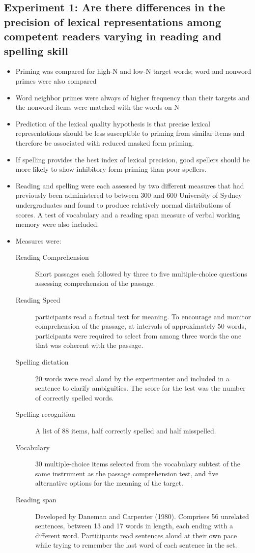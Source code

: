 \documentclass[]{article}
\begin{document}
		\subsection{Experiment 1: Are there differences in the precision of lexical representations among competent readers varying in reading and spelling skill}	
		\begin{itemize}
		\item Priming was compared for high-N and low-N target words; word and nonword primes were also compared
		\item Word neighbor primes were always of higher frequency than their targets and the nonword items were matched with the words on N
		\item Prediction of the lexical quality hypothesis is that precise lexical representations should be less susceptible to priming from similar items and therefore be associated with reduced masked form priming.
		\item If spelling provides the best index of lexical precision, good spellers should be more likely to show inhibitory form priming than poor spellers.
		\item  Reading and spelling were each assessed by two different measures that had previously been administered to between 300 and 600 University of Sydney undergraduates and found to produce relatively normal distributions of scores. A test of vocabulary and a reading span measure of verbal working memory were also included.
		\item Measures were:
		\begin{description}
			\item [Reading Comprehension]  Short passages each  followed by three to five multiple-choice questions assessing comprehension of the passage.
			\item [Reading Speed] participants read a factual text for meaning. To encourage and monitor comprehension of the passage, at intervals of approximately 50 words, participants were required to select from among three words the one that was coherent with the passage.
			\item[Spelling dictation] 20 words were read aloud by the experimenter and included in a sentence to clarify ambiguities. The score for the test was the number of correctly spelled words.
			\item[Spelling recognition] A list of 88 items, half correctly spelled and half misspelled.
			\item[Vocabulary]  30 multiple-choice items selected from the vocabulary subtest of the same instrument as the passage comprehension test, and five alternative options for the meaning of the target.
			\item[Reading span] Developed by Daneman and Carpenter (1980). Comprises 56 unrelated sentences, between 13 and 17 words in length, each ending with a different word. Participants read sentences aloud at their own pace while trying to remember the last word of each sentence in the set.
		\end{description}
		

\end{itemize}
\end{document}
